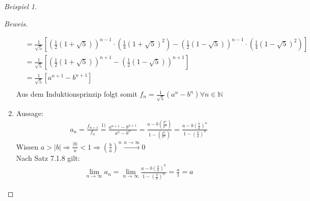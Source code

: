 \documentclass[12pt,a4paper,titlepage]{article} %
\theoremstyle{definition}
\theoremstyle{remark}
\newtheorem*{bsp}{Beispiel}
\newenvironment{bew}{\begin{proof}[Beweis]}{\end{proof}}
\newcommand{\N}{\mathbb{N}}
\newcommand{\limes}[1]{\lim\limits_{#1\rightarrow\infty}}
\begin{document}
\begin{bsp}
\begin{bew}
\begin{enumerate}
\begin{align*}
						&= \frac{1}{\sqrt{5}}\left[\left(\frac{1}{2}\left(1 + \sqrt{5}\right)\right)^{n-1}\cdot\left(\frac{1}{4}\left(1+\sqrt{5}\right)^2\right) - \left(\frac{1}{2}\left(1 - \sqrt{5}\right)\right)^{n-1}\cdot\left(\frac{1}{4}\left(1 - \sqrt{5}\right)^2\right)\right]\\
						&= \frac{1}{\sqrt{5}}\left[\left(\frac{1}{2}\left(1 + \sqrt{5}\right)\right)^{n+1} - \left(\frac{1}{2}\left(1 - \sqrt{5}\right)\right)^{n+1}\right]\\
						&= \frac{1}{\sqrt{5}}\left[a^{n+1} - b^{n+1}\right]\\
					\end{align*}
					Aus dem Induktionsprinzip folgt somit \(f_n = \frac{1}{\sqrt{5}}\left(a^n-b^n\right) \forall n \in \N \)
				\item Aussage:\\
				\begin{align*}
					a_n = \frac{f_{n+1}}{f_n} \overset{\text{1)}}{=} \frac{a^{n+1} - b^{n+1}}{a^n - b^n} = \frac{a - b\left(\frac{b^n}{a^n}\right)}{1 - \left(\frac{b^n}{a^n}\right)} = \frac{a - b\left(\frac{b}{a}\right)^n}{1 - \left(\frac{b}{a}\right)^n}
				\end{align*}
				Wissen \(a > |b| \Rightarrow \frac{|b|}{a} < 1 \Rightarrow \left(\frac{b}{a}\right)^n \overset{n \rightarrow \infty}{\rightarrow} 0\)\\
				Nach Satz 7.1.8 gilt:
				\begin{align*}
					\limes{n} a_n = \limes{n} \frac{a - b\left(\frac{b}{a}\right)^n}{1 - \left(\frac{b}{a}\right)^n} = \frac{a}{1} = a
				\end{align*}
			\end{enumerate}
		\end{bew}
	\end{bsp}
\end{document}
